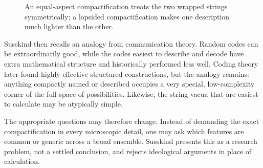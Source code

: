 \begin{figure}[htbp]
\centering
{}
\caption{An equal-aspect compactification treats the two wrapped strings symmetrically; a lopsided compactification makes one description much lighter than the other.}
\end{figure}

\begin{classroomqa}
\end{classroomqa}


Susskind then recalls an analogy from communication theory. Random codes can be extraordinarily good, while the codes easiest to describe and decode have extra mathematical structure and historically performed less well. Coding theory later found highly effective structured constructions, but the analogy remains: anything compactly named or described occupies a very special, low-complexity corner of the full space of possibilities. Likewise, the string vacua that are easiest to calculate may be atypically simple.

The appropriate questions may therefore change. Instead of demanding the exact compactification in every microscopic detail, one may ask which features are common or generic across a broad ensemble. Susskind presents this as a research problem, not a settled conclusion, and rejects ideological arguments in place of calculation.

